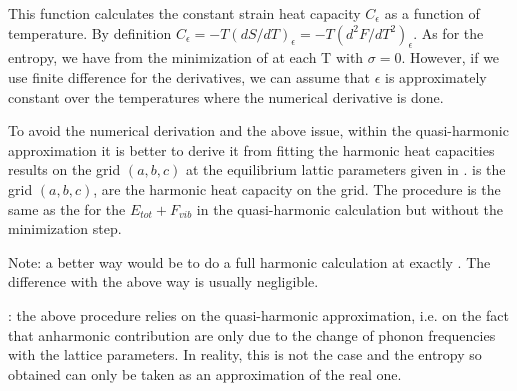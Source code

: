 \documentclass[letterpaper,10pt,english]{sphinxmanual}
\begin{document}
\begin{fulllineitems}
\label{pyqha:pyqha.properties_anis.compute_Ceps}
This function calculates the constant strain heat capacity \(C_{\epsilon}\)
as a function of temperature. 
By definition \(C_{\epsilon} = -T(dS/dT)_{\epsilon}=-T(d^2F/dT^2)_{\epsilon}\). 
As for the entropy, we have  from the
minimization of  at each T with \(\sigma=0\). However, if we use finite
difference for the derivatives, we can assume that  \(\epsilon\) is 
approximately constant over the temperatures where the numerical derivative 
is done.

To avoid the numerical derivation and the above issue, within the quasi-harmonic
approximation it is better to derive it from fitting the harmonic heat capacities
results on the grid \((a,b,c)\) at the equilibrium lattic parameters given
in .  is the grid \((a,b,c)\),  are the harmonic 
heat capacity on the grid.
The procedure is the same as the for the \(E_{tot}+F_{vib}\) in the quasi-harmonic
calculation but without the minimization step.

Note: a better way would be to do a full harmonic calculation at exactly .
The difference with the above way is usually negligible.

: the above procedure relies on the quasi-harmonic approximation,
i.e. on the fact that anharmonic contribution are only due to the change of
phonon frequencies with the lattice parameters. In reality, this is not the 
case and the entropy so obtained can only be taken as an approximation of the
real one.

\end{fulllineitems}

\end{document}
